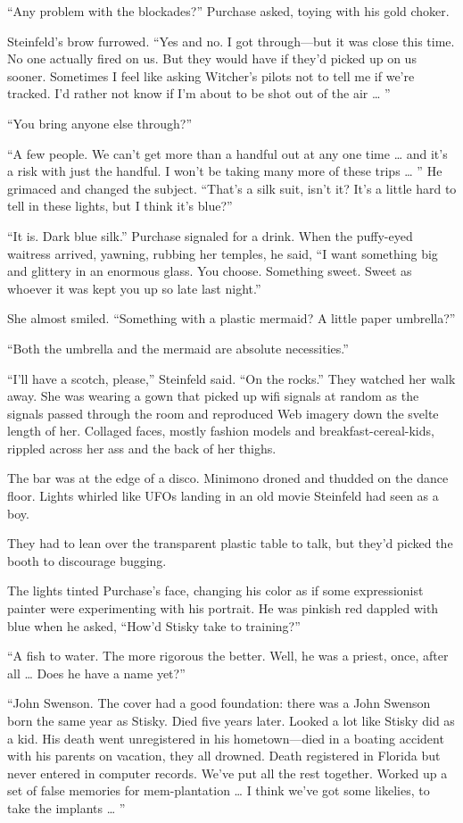 “Any problem with the blockades?” Purchase asked, toying with his gold choker.

Steinfeld’s brow furrowed. “Yes and no. I got through—but it was close this time. No one actually fired on us. But they would have if they’d picked up on us sooner. Sometimes I feel like asking Witcher’s pilots not to tell me if we’re tracked. I’d rather not know if I’m about to be shot out of the air … ”

“You bring anyone else through?”

“A few people. We can’t get more than a handful out at any one time … and it’s a risk with just the handful. I won’t be taking many more of these trips … ” He grimaced and changed the subject. “That’s a silk suit, isn’t it? It’s a little hard to tell in these lights, but I think it’s blue?”

“It is. Dark blue silk.” Purchase signaled for a drink. When the puffy-eyed waitress arrived, yawning, rubbing her temples, he said, “I want something big and glittery in an enormous glass. You choose. Something sweet. Sweet as whoever it was kept you up so late last night.”

She almost smiled. “Something with a plastic mermaid? A little paper umbrella?”

“Both the umbrella and the mermaid are absolute necessities.”

“I’ll have a scotch, please,” Steinfeld said. “On the rocks.” They watched her walk away. She was wearing a gown that picked up wifi signals at random as the signals passed through the room and reproduced Web imagery down the svelte length of her. Collaged faces, mostly fashion models and breakfast-cereal-kids, rippled across her ass and the back of her thighs.

The bar was at the edge of a disco. Minimono droned and thudded on the dance floor. Lights whirled like UFOs landing in an old movie Steinfeld had seen as a boy.

They had to lean over the transparent plastic table to talk, but they’d picked the booth to discourage bugging.

The lights tinted Purchase’s face, changing his color as if some expressionist painter were experimenting with his portrait. He was pinkish red dappled with blue when he asked, “How’d Stisky take to training?”

“A fish to water. The more rigorous the better. Well, he was a priest, once, after all … Does he have a name yet?”

“John Swenson. The cover had a good foundation: there was a John Swenson born the same year as Stisky. Died five years later. Looked a lot like Stisky did as a kid. His death went unregistered in his hometown—died in a boating accident with his parents on vacation, they all drowned. Death registered in Florida but never entered in computer records. We’ve put all the rest together. Worked up a set of false memories for mem-plantation … I think we’ve got some likelies, to take the implants … ”

